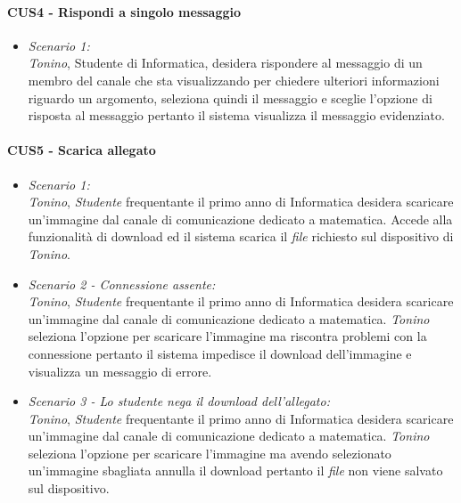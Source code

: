 \paragraph{CUS4 - Rispondi a singolo messaggio\\}
\begin{itemize}
	\item \textit{Scenario 1:\\}
	\textit{Tonino}, Studente di Informatica, desidera rispondere al messaggio di un membro del canale che sta visualizzando per chiedere ulteriori informazioni riguardo un argomento, seleziona quindi il messaggio e sceglie l’opzione di risposta al messaggio pertanto il sistema visualizza il messaggio evidenziato.
\end{itemize}

\paragraph{CUS5 - Scarica  allegato\\}
\begin{itemize}
	\item \textit{Scenario 1:\\}
	\textit{Tonino}, \textit{Studente} frequentante il primo anno di Informatica desidera scaricare un’immagine dal canale di comunicazione dedicato a matematica. Accede alla funzionalità di download ed il sistema scarica il \textit{file} richiesto sul dispositivo di \textit{Tonino}.\\
	
	\item \textit{Scenario 2 - Connessione assente:\\}
	\textit{Tonino}, \textit{Studente} frequentante il primo anno di Informatica desidera scaricare un’immagine dal canale di comunicazione dedicato a matematica. \textit{Tonino} seleziona l’opzione per scaricare l’immagine ma riscontra problemi con la connessione pertanto il sistema impedisce il download dell’immagine e visualizza un messaggio di errore.\\
	
	\item \textit{Scenario 3 - Lo studente nega il download dell'allegato:\\}
	\textit{Tonino}, \textit{Studente} frequentante il primo anno di Informatica desidera scaricare un’immagine dal canale di comunicazione dedicato a matematica. \textit{Tonino} seleziona l’opzione per scaricare l’immagine ma avendo selezionato un’immagine sbagliata annulla il download pertanto il \textit{file} non viene salvato sul dispositivo.\\
\end{itemize}

